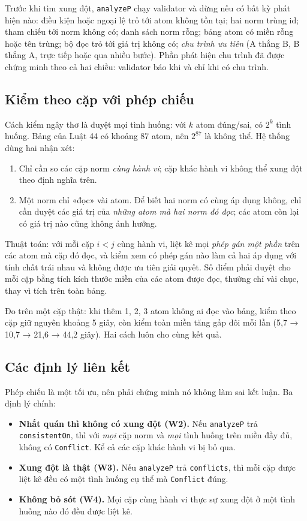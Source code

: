 \documentclass[12pt,a4paper]{article}
\newcommand{\code}[1]{\texttt{#1}}
\begin{document}
Trước khi tìm xung đột, \code{analyzeP} chạy validator và dừng nếu có bất kỳ phát hiện nào: điều kiện hoặc ngoại lệ trỏ tới
atom không tồn tại; hai norm trùng id; tham chiếu tới norm không có; danh sách norm rỗng; bảng atom có miền rỗng hoặc tên
trùng; bộ đọc trỏ tới giá trị không có; \emph{chu trình ưu tiên} (A thắng B, B thắng A, trực tiếp hoặc qua nhiều bước). Phần
phát hiện chu trình đã được chứng minh theo cả hai chiều: validator báo khi và chỉ khi có chu trình.

\subsection{Kiểm theo cặp với phép chiếu}

Cách kiểm ngây thơ là duyệt mọi tình huống: với $k$ atom đúng/sai, có $2^k$ tình huống. Bảng của Luật 44 có khoảng 87 atom,
nên $2^{87}$ là không thể. Hệ thống dùng hai nhận xét:
\begin{enumerate}
  \item Chỉ cần so các cặp norm \emph{cùng hành vi}; cặp khác hành vi không thể xung đột theo định nghĩa trên.
  \item Một norm chỉ «đọc» vài atom. Để biết hai norm có cùng áp dụng không, chỉ cần duyệt các giá trị của \emph{những atom
    mà hai norm đó đọc}; các atom còn lại có giá trị nào cũng không ảnh hưởng.
\end{enumerate}
Thuật toán: với mỗi cặp $i<j$ cùng hành vi, liệt kê mọi \emph{phép gán một phần} trên các atom mà cặp đó đọc, và kiểm xem có
phép gán nào làm cả hai áp dụng với tính chất trái nhau và không được ưu tiên giải quyết. Số điểm phải duyệt cho mỗi cặp bằng
tích kích thước miền của các atom được đọc, thường chỉ vài chục, thay vì tích trên toàn bảng.

Đo trên một cặp thật: khi thêm 1, 2, 3 atom không ai đọc vào bảng, kiểm theo cặp giữ nguyên khoảng 5 giây, còn kiểm toàn miền
tăng gấp đôi mỗi lần (5,7 → 10,7 → 21,6 → 44,2 giây). Hai cách luôn cho cùng kết quả.

\subsection{Các định lý liên kết}\label{sec:link}

Phép chiếu là một tối ưu, nên phải chứng minh nó không làm sai kết luận. Ba định lý chính:

\begin{keybox}
\begin{itemize}[leftmargin=1.2em]
  \item \textbf{Nhất quán thì không có xung đột (W2).} Nếu \code{analyzeP} trả \code{consistentOn}, thì với \emph{mọi} cặp
    norm và \emph{mọi} tình huống trên miền đầy đủ, không có \code{Conflict}. Kể cả các cặp khác hành vi bị bỏ qua.
  \item \textbf{Xung đột là thật (W3).} Nếu \code{analyzeP} trả \code{conflicts}, thì mỗi cặp được liệt kê đều có một tình
    huống cụ thể mà \code{Conflict} đúng.
  \item \textbf{Không bỏ sót (W4).} Mọi cặp cùng hành vi thực sự xung đột ở một tình huống nào đó đều được liệt kê.
\end{itemize}
\end{keybox}
\end{document}
